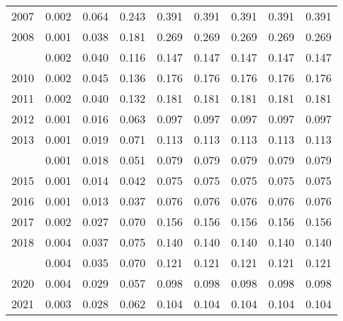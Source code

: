 \documentclass[
]{article}
\begin{document}
\begin{longtable}[t]{lrrrrrrrr}
2007 & 0.002 & 0.064 & 0.243 & 0.391 & 0.391 & 0.391 & 0.391 & 0.391\\
2008 & 0.001 & 0.038 & 0.181 & 0.269 & 0.269 & 0.269 & 0.269 & 0.269\\
\addlinespace
2009 & 0.002 & 0.040 & 0.116 & 0.147 & 0.147 & 0.147 & 0.147 & 0.147\\
2010 & 0.002 & 0.045 & 0.136 & 0.176 & 0.176 & 0.176 & 0.176 & 0.176\\
2011 & 0.002 & 0.040 & 0.132 & 0.181 & 0.181 & 0.181 & 0.181 & 0.181\\
2012 & 0.001 & 0.016 & 0.063 & 0.097 & 0.097 & 0.097 & 0.097 & 0.097\\
2013 & 0.001 & 0.019 & 0.071 & 0.113 & 0.113 & 0.113 & 0.113 & 0.113\\
\addlinespace
2014 & 0.001 & 0.018 & 0.051 & 0.079 & 0.079 & 0.079 & 0.079 & 0.079\\
2015 & 0.001 & 0.014 & 0.042 & 0.075 & 0.075 & 0.075 & 0.075 & 0.075\\
2016 & 0.001 & 0.013 & 0.037 & 0.076 & 0.076 & 0.076 & 0.076 & 0.076\\
2017 & 0.002 & 0.027 & 0.070 & 0.156 & 0.156 & 0.156 & 0.156 & 0.156\\
2018 & 0.004 & 0.037 & 0.075 & 0.140 & 0.140 & 0.140 & 0.140 & 0.140\\
\addlinespace
2019 & 0.004 & 0.035 & 0.070 & 0.121 & 0.121 & 0.121 & 0.121 & 0.121\\
2020 & 0.004 & 0.029 & 0.057 & 0.098 & 0.098 & 0.098 & 0.098 & 0.098\\
2021 & 0.003 & 0.028 & 0.062 & 0.104 & 0.104 & 0.104 & 0.104 & 0.104\\*
\end{longtable}
\end{document}
